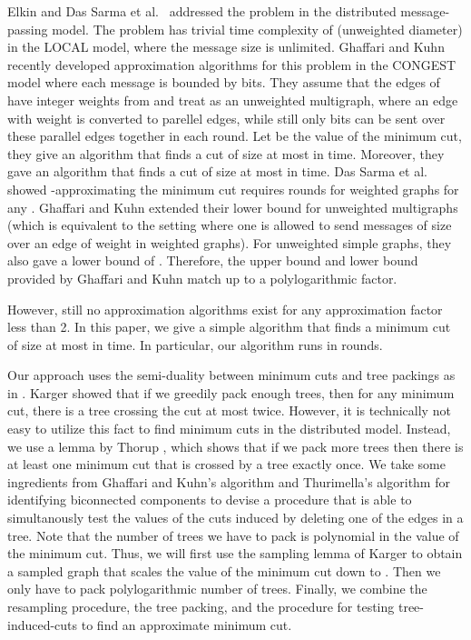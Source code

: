 \documentclass[11pt]{article}
\begin{document}
Elkin \cite{Elkin04} and Das Sarma et al.~\cite{DasSarma12} addressed the problem in the distributed message-passing model. The problem has trivial time complexity of  (unweighted diameter) in the \textsf{LOCAL} model, where the message size is unlimited. Ghaffari and Kuhn \cite{GK13} recently developed approximation algorithms for this problem in the \textsf{CONGEST} model where each message is bounded by  bits. They assume that the edges of  have integer weights from  and treat  as an unweighted multigraph, where an edge  with weight  is converted to  parellel edges, while still only  bits can be sent over these parallel edges together in each round. Let  be the value of the minimum cut, they give an algorithm that finds a cut of size at most  in  time. Moreover, they gave an algorithm that finds a cut of size at most  in  time. Das Sarma et al.~\cite{DasSarma12} showed -approximating the minimum cut requires  rounds for weighted graphs for any . Ghaffari and Kuhn extended their lower bound for unweighted multigraphs (which is equivalent to the setting where one is allowed to send messages of size  over an edge of weight  in weighted graphs). For unweighted simple graphs, they also gave a lower bound of . Therefore, the upper bound and lower bound provided by Ghaffari and Kuhn match up to a polylogarithmic factor. 

However, still no approximation algorithms exist for any approximation factor less than 2. In this paper, we give a simple algorithm that finds a minimum cut of size at most  in  time. In particular, our algorithm runs in  rounds. 

Our approach uses the semi-duality between minimum cuts and tree packings as in \cite{Karger2000, Thorup07}. Karger \cite{Karger2000} showed that if we greedily pack enough trees, then for any minimum cut, there is a tree crossing the cut at most twice. However, it is technically not easy to utilize this fact to find minimum cuts in the distributed model. Instead, we use a lemma by Thorup \cite{Thorup07}, which shows that if we pack more trees then there is at least one minimum cut that is crossed by a tree exactly once. We take some ingredients from Ghaffari and Kuhn's algorithm and Thurimella's algorithm \cite{Thurimella97} for identifying biconnected components to devise a procedure that is able to simultanously test the values of the  cuts induced by deleting one of the  edges in a tree. Note that the number of trees we have to pack is polynomial in the value of the minimum cut. Thus, we will first use the sampling lemma of Karger \cite{Karger94} to obtain a sampled graph that scales the value of the minimum cut down to . Then we only have to pack polylogarithmic number of trees. Finally, we combine the resampling procedure, the tree packing, and the procedure for testing tree-induced-cuts to find an approximate minimum cut.
\end{document}
